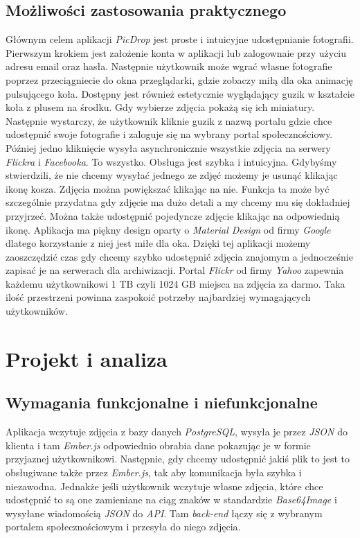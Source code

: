 \documentclass[openright]{xmgr}
\begin{document}
\section{Możliwości zastosowania praktycznego}
Głównym celem aplikacji \textit{PicDrop} jest proste i intuicyjne udostępnianie fotografii. Pierwszym krokiem jest założenie konta w aplikacji lub zalogownaie przy użyciu adresu email oraz hasła. Następnie użytkownik może wgrać własne fotografie poprzez przeciągniecie do okna przeglądarki, gdzie zobaczy miłą dla oka animację pulsującego koła. Dostępny jest również estetycznie wyglądający guzik w kształcie koła z plusem na środku. Gdy wybierze zdjęcia pokażą się ich miniatury. Następnie wystarczy, że użytkownik kliknie guzik z nazwą portalu gdzie chce udostępnić swoje fotografie i zaloguje się na wybrany portal społecznościowy. Później jedno kliknięcie wysyła asynchronicznie wszystkie zdjęcia na serwery \textit{Flickra} i \textit{Facebooka}. To wszystko. Obsługa jest szybka i intuicyjna. Gdybyśmy stwierdzili, że nie chcemy wysyłać jednego ze zdjęć możemy je usunąć klikając ikonę kosza. Zdjęcia można powiększać klikając na nie. Funkcja ta może być szczególnie przydatna gdy zdjęcie ma dużo detali a my chcemy mu się dokładniej przyjrzeć. Można także udostępnić pojedyncze zdjęcie klikając na  odpowiednią ikonę. Aplikacja ma piękny design oparty o \textit{Material Design} od firmy \textit{Google} dlatego korzystanie z niej jest miłe dla oka. Dzięki tej aplikacji możemy zaoszczędzić czas gdy chcemy szybko udostępnić zdjęcia znajomym a jednocześnie zapisać je na serwerach dla archiwizacji. Portal \textit{Flickr} od firmy \textit{Yahoo} zapewnia każdemu użytkownikowi 1 TB czyli 1024 GB miejsca na zdjęcia za darmo. Taka ilość przestrzeni powinna zaspokoić potrzeby najbardziej wymagających użytkowników.

\chapter{Projekt i analiza}
\section{Wymagania funkcjonalne i niefunkcjonalne}
Aplikacja wczytuje zdjęcia z bazy danych \textit{PostgreSQL}, wysyła je przez \textit{JSON} do klienta i tam \textit{Ember.js} odpowiednio obrabia dane pokazując je w formie przyjaznej użytkownikowi. Następnie, gdy chcemy udostępnić jakiś plik to jest to obsługiwane także przez \textit{Ember.js}, tak aby komunikacja była szybka i niezawodna. Jednakże jeśli użytkownik wczytuje własne zdjęcia, które chce udostępnić to są one zamieniane na ciąg znaków w standardzie \textit{Base64Image} i wysyłane wiadomością \textit{JSON} do \textit{API}. Tam \textit{back-end} łączy się z wybranym portalem społecznościowym i przesyła do niego zdjęcia.
\end{document}
